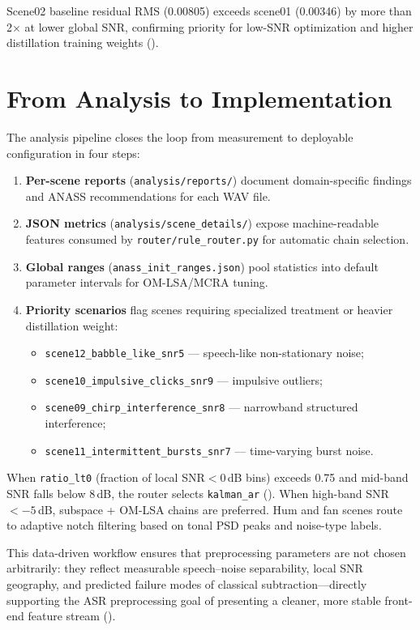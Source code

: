 Scene02 baseline residual RMS (0.00805) exceeds scene01 (0.00346) by more than 2$\times$ at lower global SNR, confirming priority for low-SNR optimization and higher distillation training weights ().

\section{From Analysis to Implementation}
\label{sec:analysis_to_impl}

The analysis pipeline closes the loop from measurement to deployable configuration in four steps:

\begin{enumerate}
  \item \textbf{Per-scene reports} (\texttt{analysis/reports/}) document domain-specific findings and ANASS recommendations for each WAV file.
  \item \textbf{JSON metrics} (\texttt{analysis/scene\_details/}) expose machine-readable features consumed by \texttt{router/rule\_router.py} for automatic chain selection.
  \item \textbf{Global ranges} (\texttt{anass\_init\_ranges.json}) pool statistics into default parameter intervals for OM-LSA/MCRA tuning.
  \item \textbf{Priority scenarios} flag scenes requiring specialized treatment or heavier distillation weight:
  \begin{itemize}
    \item \texttt{scene12\_babble\_like\_snr5} --- speech-like non-stationary noise;
    \item \texttt{scene10\_impulsive\_clicks\_snr9} --- impulsive outliers;
    \item \texttt{scene09\_chirp\_interference\_snr8} --- narrowband structured interference;
    \item \texttt{scene11\_intermittent\_bursts\_snr7} --- time-varying burst noise.
  \end{itemize}
\end{enumerate}

When \texttt{ratio\_lt0} (fraction of local SNR${}<0$\,dB bins) exceeds 0.75 and mid-band SNR falls below 8\,dB, the router selects \texttt{kalman\_ar} (). When high-band SNR${}< -5$\,dB, subspace + OM-LSA chains are preferred. Hum and fan scenes route to adaptive notch filtering based on tonal PSD peaks and noise-type labels.

This data-driven workflow ensures that preprocessing parameters are not chosen arbitrarily: they reflect measurable speech--noise separability, local SNR geography, and predicted failure modes of classical subtraction---directly supporting the ASR preprocessing goal of presenting a cleaner, more stable front-end feature stream ().

